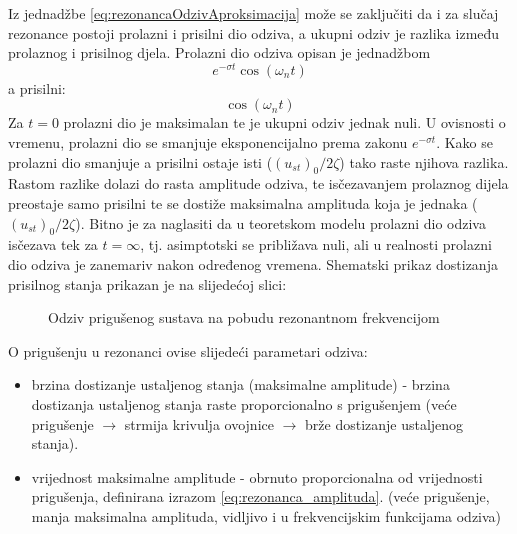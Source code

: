 Iz jednadžbe \eqref{eq:rezonancaOdzivAproksimacija} može se zaključiti da i za
slučaj rezonance postoji prolazni i prisilni dio odziva, a ukupni odziv je razlika
između prolaznog i prisilnog djela. 
\newpage
Prolazni dio odziva opisan je jednadžbom
\[
    e^{-\sigma t} \cos(\omega_n t)
\]
a prisilni:
\[
    \cos(\omega_n t)
\]
Za $t=0$ prolazni dio je maksimalan te je ukupni odziv jednak nuli. U ovisnosti o
vremenu, prolazni dio se smanjuje eksponencijalno prema zakonu $e^{-\sigma t}$. Kako
se prolazni dio smanjuje a prisilni ostaje isti ($(u_{st})_0/2\zeta$) tako raste
njihova razlika. Rastom razlike dolazi do rasta amplitude odziva, te isčezavanjem
prolaznog dijela preostaje samo prisilni te se dostiže maksimalna amplituda koja je
jednaka ($(u_{st})_0/2\zeta$). Bitno je za naglasiti da u teoretskom modelu
prolazni dio odziva isčezava tek za $t=\infty$, tj. asimptotski se približava nuli,
ali u realnosti prolazni dio odziva je zanemariv nakon određenog vremena. Shematski
prikaz dostizanja prisilnog stanja prikazan je na slijedećoj slici:
\begin{figure}[H]
     
    \caption{Odziv prigušenog sustava na pobudu rezonantnom frekvencijom}
    \label{fig:rezonanca-priguseno}
\end{figure}

O prigušenju u rezonanci ovise slijedeći parametari odziva:
\begin{itemize}
    \item brzina dostizanje ustaljenog stanja (maksimalne amplitude) - brzina dostizanja 
        ustaljenog stanja raste proporcionalno s prigušenjem (veće prigušenje $\to$ strmija krivulja
        ovojnice $\to$ brže dostizanje ustaljenog stanja).

    \item vrijednost maksimalne amplitude - obrnuto proporcionalna od vrijednosti
        prigušenja, definirana izrazom \eqref{eq:rezonanca_amplituda}. 
        (veće prigušenje, manja maksimalna amplituda, vidljivo i u frekvencijskim funkcijama odziva)
\end{itemize}

